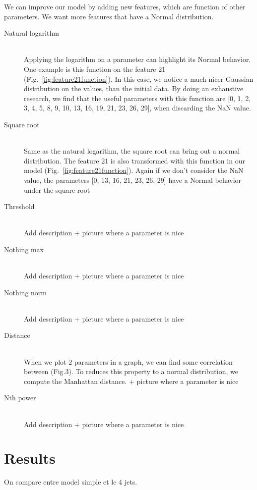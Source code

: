 \documentclass[10pt,conference,compsocconf]{IEEEtran}
\begin{document}
	We can improve our model by adding new features, which are function of other parameters. We want more features that have a Normal distribution. 
	\begin{description}
		\item[Natural logarithm] \ \\
		Applying the logarithm on a parameter can highlight its Normal behavior. One example is this function on the feature 21 (Fig.~\ref{fig:feature21function}). In this case, we notice a much nicer Gaussian distribution on the values, than the initial data. By doing an exhaustive research, we find that the useful parameters with this function are [0, 1, 2, 3, 4, 5, 8, 9, 10, 13, 16, 19, 21, 23, 26, 29], when discarding the NaN value.
		\item[Square root] \ \\
		Same as the natural logarithm, the square root can bring out a normal distribution. The feature 21 is also transformed with this function in our model (Fig.~\ref{fig:feature21function}). Again if we don't consider the NaN value, the parameters [0, 13, 16, 21, 23, 26, 29] have a Normal behavior under the square root
		\item[Threshold] \ \\
		Add description + picture where a parameter is nice
		\item[Nothing max] \ \\
		Add description + picture where a parameter is nice
		\item[Nothing norm] \ \\
		Add description + picture where a parameter is nice
		\item[Distance] \ \\
		When we plot 2 parameters in a graph, we can find some correlation between (Fig.3). To reduces this property to a normal distribution, we compute the Manhattan distance. + picture where a parameter is nice
		\item[Nth power] \ \\
		Add description + picture where a parameter is nice
	\end{description}
	\section{Results}
	On compare entre model simple et le 4 jets.
	
\end{document}
